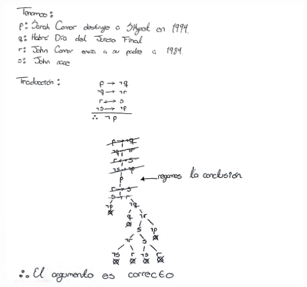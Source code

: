 \documentclass[11pt,letterpaper]{article}
\begin{document}
\begin{enumerate}
    \begin{center}
    \includegraphics[width=\textwidth,height=0.8\textheight,keepaspectratio]{ejercicio7.png}
    \end{center}
    
\end{enumerate}
\end{document}
